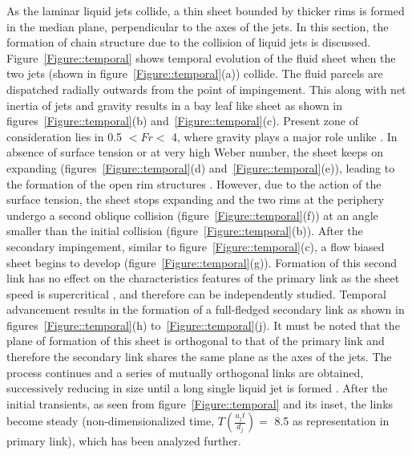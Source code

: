 \documentclass[%
 aip,
 sd,%
amsmath,amssymb,
preprint,%
author-year,%
]{revtex4-1}
\begin{document}
As the laminar liquid jets collide, a thin sheet bounded by thicker rims is formed in the median plane, perpendicular to the axes of the jets. In this section, the formation of chain structure due to the collision of liquid jets is discussed. Figure~\ref{Figure::temporal} shows temporal evolution of the fluid sheet when the two jets (shown in figure~\ref{Figure::temporal}(a)) collide. The fluid parcels are dispatched radially outwards from the point of impingement. This along with net inertia of jets and gravity results in a bay leaf like sheet as shown in figures~\ref{Figure::temporal}(b) and~\ref{Figure::temporal}(c). Present zone of consideration lies in 0.5 $< Fr <$ 4, where gravity plays a major role unlike \cite{bush2004collision,bremond2006atomization}. In absence of surface tension or at very high Weber number, the sheet keeps on expanding (figures~\ref{Figure::temporal}(d) and~\ref{Figure::temporal}(e)), leading to the formation of the open rim structures \citep{taylor1960formation,chen2013high}. However, due to the action of the surface tension, the sheet stops expanding and the two rims at the periphery undergo a second oblique collision (figure~\ref{Figure::temporal}(f)) at an angle smaller than the initial collision (figure~\ref{Figure::temporal}(b)). After the secondary impingement, similar to figure~\ref{Figure::temporal}(c), a flow biased sheet begins to develop (figure~\ref{Figure::temporal}(g)). Formation of this second link has no effect on the characteristics features of the primary link as the sheet speed is supercritical \citep{bush2004collision}, and therefore can be independently studied. Temporal advancement results in the formation of a full-fledged secondary link as shown in figures~\ref{Figure::temporal}(h) to~\ref{Figure::temporal}(j). It must be noted that the plane of formation of this sheet is orthogonal to that of the primary link and therefore the secondary link shares the same plane as the axes of the jets. The process continues and a series of mutually orthogonal links are obtained, successively reducing in size until a long single liquid jet is formed \citep{bush2004collision}. After the initial transients, as seen from figure~\ref{Figure::temporal} and its inset, the links become steady (non-dimensionalized time, $T \left(\frac{u_jt}{d_j}\right) = $ 8.5 as representation in primary link), which has been analyzed further. \\
\end{document}
